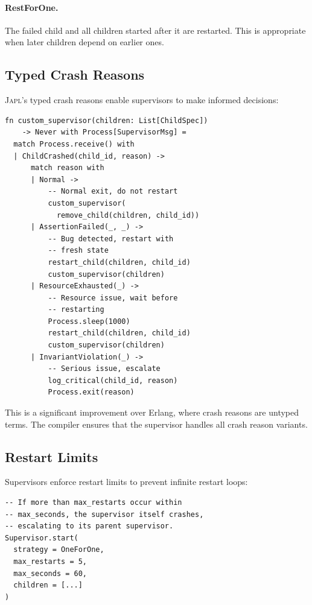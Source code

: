 \documentclass[11pt,twocolumn]{article}
\newcommand{\japl}{\textsc{Japl}}
\begin{document}
\paragraph{RestForOne.} The failed child and all children started after it are restarted. This is appropriate when later children depend on earlier ones.

\subsection{Typed Crash Reasons}

\japl{}'s typed crash reasons enable supervisors to make informed decisions:

\begin{lstlisting}
fn custom_supervisor(children: List[ChildSpec])
    -> Never with Process[SupervisorMsg] =
  match Process.receive() with
  | ChildCrashed(child_id, reason) ->
      match reason with
      | Normal ->
          -- Normal exit, do not restart
          custom_supervisor(
            remove_child(children, child_id))
      | AssertionFailed(_, _) ->
          -- Bug detected, restart with
          -- fresh state
          restart_child(children, child_id)
          custom_supervisor(children)
      | ResourceExhausted(_) ->
          -- Resource issue, wait before
          -- restarting
          Process.sleep(1000)
          restart_child(children, child_id)
          custom_supervisor(children)
      | InvariantViolation(_) ->
          -- Serious issue, escalate
          log_critical(child_id, reason)
          Process.exit(reason)
\end{lstlisting}

This is a significant improvement over Erlang, where crash reasons are untyped terms. The compiler ensures that the supervisor handles all crash reason variants.

\subsection{Restart Limits}

Supervisors enforce restart limits to prevent infinite restart loops:

\begin{lstlisting}
-- If more than max_restarts occur within
-- max_seconds, the supervisor itself crashes,
-- escalating to its parent supervisor.
Supervisor.start(
  strategy = OneForOne,
  max_restarts = 5,
  max_seconds = 60,
  children = [...]
)
\end{lstlisting}
\end{document}
